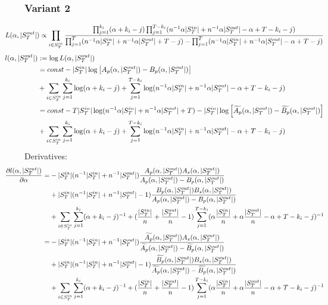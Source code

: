 \documentclass[a4paper, 12pt]{article}
\newcommand{\sout}[1][T]{|S^{out}_{#1}|}
\newcommand{\sint}[1][T]{|S^{in}_{#1}|}
\begin{document}
\subsubsection{Variant 2} \label{s:v2}
\begin{align*}
    \hspace*{-1cm}
    L(\alpha, \sout) &\propto \prod_{i \in S_T^{in}} \frac{\prod_{j=1}^{k_i} (\alpha + k_i - j)\prod_{j=1}^{T - k_i} (n^{-1} \alpha \sint + n^{-1} \alpha \sout -\alpha + T - k_i - j)}{\prod_{j=1}^T(n^{-1}\alpha \sint + n^{-1} \alpha \sout + T - j) - \prod_{j=1}^T (n^{-1} \alpha \sint + n^{-1} \alpha \sout - \alpha + T - j)} \\
\end{align*}
\begin{align} \label{eq:7}
    \hspace*{-1cm}
    l(\alpha, \sout) &:= \log L(\alpha, \sout) \nonumber \\
    &= const - \sint \log \left[A_p(\alpha, \sout) - B_p(\alpha, \sout) \right] \nonumber \\
    &+ \sum_{i \in S_T^{in}} \sum_{j = 1}^{k_i} \log(\alpha + k_i - j) + \sum_{j = 1}^{T - k_i} \log(n^{-1} \alpha \sint + n^{-1} \alpha \sout - \alpha + T - k_i - j) \nonumber \\
    &= const - T\sint \log(n^{-1}\alpha\sint + n^{-1}\alpha\sout + T) - \sint \log \left[\widetilde{A_p}(\alpha, \sout) - \widetilde{B_p}(\alpha, \sout) \right] \nonumber \\
    &+ \sum_{i \in S_T^{in}} \sum_{j = 1}^{k_i} \log(\alpha + k_i - j) + \sum_{j = 1}^{T - k_i} \log(n^{-1} \alpha \sint + n^{-1} \alpha \sout - \alpha + T - k_i - j) \nonumber \\
\end{align}
Derivatives:
\begin{align} \label{eq:8}
    \hspace{-1cm}
    \frac{\partial l(\alpha, \sout)}{\partial \alpha} =& -\sint(n^{-1}\sint + n^{-1}\sout) \frac{ A_p(\alpha, \sout) A_s(\alpha, \sout)}{A_p(\alpha, \sout) - B_p(\alpha, \sout)}\nonumber \\
    &+ \sint (n^{-1}\sint + n^{-1}\sout - 1) \frac{B_p(\alpha, \sout) B_s(\alpha, \sout)}{A_p(\alpha, \sout) - B_p(\alpha, \sout)}\nonumber \\
    &+ \sum_{i \in S_T^{in}} \sum_{j = 1}^{k_i} (\alpha + k_i - j)^{-1} + (\frac{\sint}{n} + \frac{\sout}{n} - 1) \sum_{j = 1}^{T - k_i} (\alpha \frac{\sint}{n} + \alpha \frac{\sout}{n} - \alpha + T - k_i - j)^{-1} \nonumber \\
    =& -\sint(n^{-1}\sint + n^{-1}\sout) \frac{ \widetilde{A_p}(\alpha, \sout) A_s(\alpha, \sout)}{\widetilde{A_p}(\alpha, \sout) - \widetilde{B_p}(\alpha, \sout)}\nonumber \\
    &+ \sint(n^{-1}\sint + n^{-1}\sout - 1) \frac{ \widetilde{B_p}(\alpha, \sout) B_s(\alpha, \sout)}{\widetilde{A_p}(\alpha, \sout) - \widetilde{B_p}(\alpha, \sout)}\nonumber \\
    &+ \sum_{i \in S_T^{in}} \sum_{j = 1}^{k_i} (\alpha + k_i - j)^{-1} + (\frac{\sint}{n} + \frac{\sout}{n} - 1) \sum_{j = 1}^{T - k_i} (\alpha \frac{\sint}{n} + \alpha \frac{\sout}{n} - \alpha + T - k_i - j)^{-1} \nonumber \\
\end{align}
\end{document}
